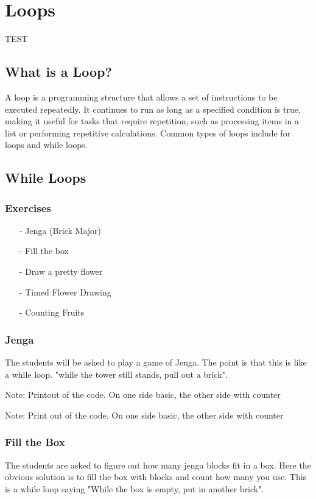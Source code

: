 \section{Loops}
TEST
\subsection{What is a Loop?}
A loop is a programming structure that allows a set of instructions to be executed repeatedly. It continues to run as long as a specified condition is true, making it useful for tasks that require repetition, such as processing items in a list or performing repetitive calculations. Common types of loops include for loops and while loops.


\subsection{While Loops}

\subsubsection{Exercises}
\begin{itemize}
    \item [-] Jenga (Brick Major)
    \item [-] Fill the box
    \item [-] Draw a pretty flower
    \item [-] Timed Flower Drawing
    \item [-] Counting Fruits
\end{itemize}

\subsubsection{Jenga}

The students will be asked to play a game of Jenga. The point is that this is like a while loop. "while the tower still stands, pull out a brick". 

Note: Printout of the code. On one side basic, the other side with counter

Note: Print out of the code. On one side basic, the other side with counter



\subsubsection{Fill the Box}

The students are asked to figure out how many jenga blocks fit in a box. Here the obvious solution is to fill the box with blocks and count how many you use. This is a while loop saying "While the box is empty, put in another brick". 

